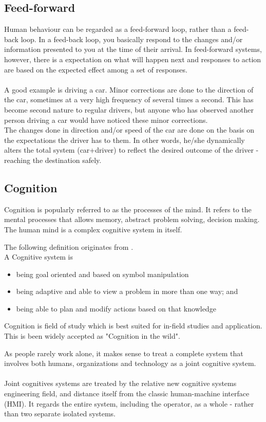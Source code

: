 \subsection{Feed-forward}
\label{sec:feed_forward}
Human behaviour can be regarded as a feed-forward loop, rather than a feed-back loop. In a feed-back loop, you basically respond to the changes and/or information presented to you at the time of their arrival. In feed-forward systems, however, there is a expectation on what will happen next and responses to action are based on the expected effect among a set of responses.\\
\\
A good example is driving a car. Minor corrections are done to the direction of the car, sometimes at a very high frequency of several times a second. This has become second nature to regular drivers, but anyone who has observed another person driving a car would have noticed these minor corrections.\\
The changes done in direction and/or speed of the car are done on the basis on the expectations the driver has to them. In other words, he/she dynamically alters the total system (car+driver) to reflect the desired outcome of the driver - reaching the destination safely.
\subsection{Cognition}
Cognition is popularly referred to as the processes of the mind. It refers to the mental processes that allows memory, abstract problem solving, decision making. The human mind is a complex cognitive system in itself.

The following definition originates from \cite{hollnagel2005joint}.\\
A Cognitive system is
\begin{itemize}
  \item being goal oriented and based on symbol manipulation
  \item being adaptive and able to view a problem in more than one way; and
  \item being able to plan and modify actions based on that knowledge
\end{itemize}
Cognition is field of study which is best suited for in-field studies and application. This is been widely accepted as "Cognition in the wild".

As people rarely work alone, it makes sense to treat a complete system that involves both humans, organizations and technology as a joint cognitive system. \cite{hollnagel2005joint}\\
\\
Joint cognitives systems are treated by the relative new cognitive systems engineering field, and distance itself from the classic human-machine interface (HMI). It regards the entire system, including the operator, as a whole - rather than two separate isolated systems.
